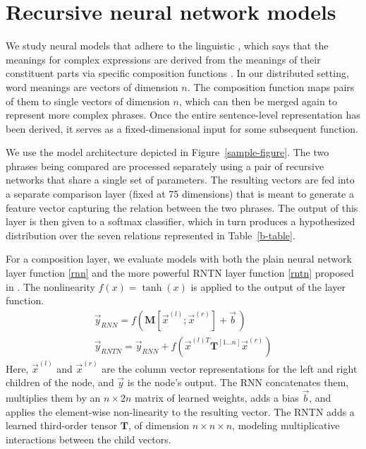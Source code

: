 
\section{Recursive neural network models} \label{methods}

We study neural models that adhere to the linguistic , which says that the meanings for complex
expressions are derived from the meanings of their constituent parts
via specific composition functions \cite{Partee84,Janssen97}. In our
distributed setting, word meanings are vectors of dimension $n$. The
composition function maps pairs of them to single vectors of dimension $n$, 
which can then be merged again to represent more complex
phrases. Once the entire sentence-level representation has been
derived, it serves as a fixed-dimensional input for some subsequent function.

We use the model architecture depicted in Figure~\ref{sample-figure}. 
The two phrases being compared are processed separately using a pair 
of recursive networks that share a single set of parameters. 
The resulting vectors are fed into a separate comparison
layer (fixed at 75 dimensions) that is meant to generate a feature vector capturing the
relation between the two phrases. The output of this layer is then
given to a softmax classifier, which in turn produces a hypothesized
distribution over the seven relations represented in Table~\ref{b-table}.

For a composition layer, we evaluate models with both the plain neural
network layer function \eqref{rnn} and the more powerful RNTN layer function
\eqref{rntn} proposed in . The nonlinearity $f(x) = \tanh(x)$ is applied to the output of the layer function.
%
\begin{gather} \label{rnn}
\vec{y}_{\textit{RNN}} = f(\mathbf{M} [\vec{x}^{(l)}; \vec{x}^{(r)}] + \vec{b}\,) \\
\label{rntn}
\vec{y}_{\textit{RNTN}} = \vec{y}_{\textit{RNN}} + f(\vec{x}^{(l)T} \mathbf{T}^{[1 \ldots n]} \vec{x}^{(r)})
\end{gather} 
%
Here, $\vec{x}^{(l)}$ and $\vec{x}^{(r)}$ are the column vector
representations for the left and right children of the node, and
$\vec{y}$ is the node's output.  The RNN concatenates them, multiplies
them by an $n \times 2n$ matrix of learned weights, adds a bias $\vec{b}$, and applies the
element-wise non-linearity to the resulting vector. The RNTN adds a learned third-order tensor 
$\mathbf{T}$, of dimension $n \times n \times n$, modeling
multiplicative interactions between the child vectors.

